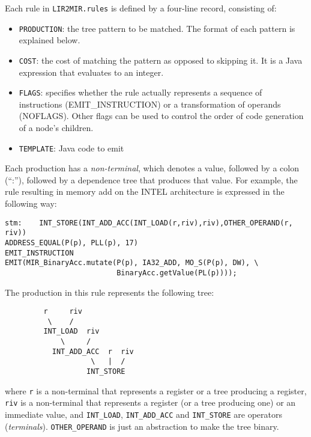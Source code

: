 Each rule in {\tt LIR2MIR.rules} is defined by a four-line record,
consisting of:
\begin{itemize}
\item {\tt PRODUCTION}: the tree pattern to be matched.  The format of each
pattern is explained below.
\item {\tt COST}: the cost of matching the pattern as opposed to skipping
it.  It is a Java\TMweb{} expression that evaluates to an integer.
\item {\tt FLAGS}: specifies whether the rule actually represents a sequence
of instructions (EMIT\_INSTRUCTION) or a transformation of operands
(NOFLAGS). Other flags can be used to control the order of code
generation of a node's children.
\item {\tt TEMPLATE}: Java code to emit
\end{itemize}

Each production has a {\em non-terminal}, which denotes a value, followed
by a colon (``:''), followed by a dependence tree that produces that value.
For example, the rule resulting in memory add on the INTEL architecture is
expressed in the following way:
\begin{verbatim}
stm:    INT_STORE(INT_ADD_ACC(INT_LOAD(r,riv),riv),OTHER_OPERAND(r, riv))
ADDRESS_EQUAL(P(p), PLL(p), 17)
EMIT_INSTRUCTION
EMIT(MIR_BinaryAcc.mutate(P(p), IA32_ADD, MO_S(P(p), DW), \
                          BinaryAcc.getValue(PL(p))));
\end{verbatim}
The production in this rule represents the following tree:
\begin{verbatim}
         r     riv
          \    /
         INT_LOAD  riv
             \     /
           INT_ADD_ACC  r  riv
                    \   |  /
                   INT_STORE
\end{verbatim}
where {\tt r} is a non-terminal that represents a register or a tree
producing a register, {\tt riv} is a non-terminal that represents a register
(or a tree producing one) or an immediate value, and {\tt INT\_LOAD},
{\tt INT\_ADD\_ACC} and {\tt INT\_STORE} are operators ({\em terminals}).
{\tt OTHER\_OPERAND} is just an abstraction to make the tree binary.

